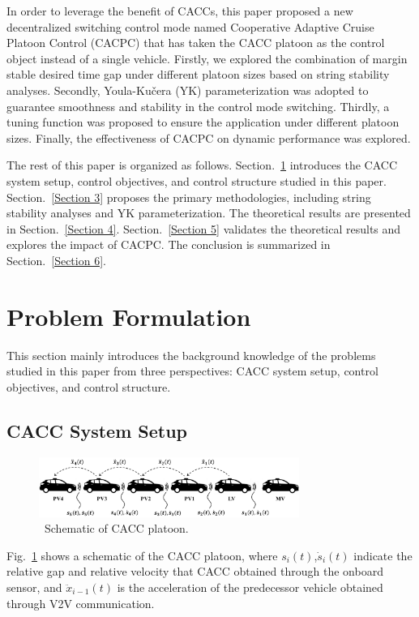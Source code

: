 \documentclass[journal]{IEEEtran}
\begin{document}
In order to leverage the benefit of CACCs, this paper proposed a new decentralized switching control mode named Cooperative Adaptive Cruise Platoon Control (CACPC) that has taken the CACC platoon as the control object instead of a single vehicle. Firstly, we explored the combination of margin stable desired time gap under different platoon sizes based on string stability analyses. Secondly, Youla-Kučera (YK) parameterization was adopted to guarantee smoothness and stability in the control mode switching. Thirdly, a tuning function was proposed to ensure the application under different platoon sizes. Finally, the effectiveness of CACPC on dynamic performance was explored.

The rest of this paper is organized as follows. Section.~\ref{Section 2} introduces the CACC system setup, control objectives, and control structure studied in this paper. Section.~\ref{Section 3} proposes the primary methodologies, including string stability analyses and YK parameterization. The theoretical results are presented in Section.~\ref{Section 4}. Section.~\ref{Section 5} validates the theoretical results and explores the impact of CACPC. The conclusion is summarized in Section.~\ref{Section 6}.


\section{Problem Formulation}
\label{Section 2}
This section mainly introduces the background knowledge of the problems studied in this paper from three perspectives: CACC system setup, control objectives, and control structure.


\subsection{CACC System Setup}
\label{Section 2.1}

\begin{figure}
  \centering
  \includegraphics[width=8.5cm]{figs/fig1.png}
  \caption{~Schematic of CACC platoon.}
  \label{fig1}
\end{figure}

Fig.~\ref{fig1} shows a schematic of the CACC platoon, where $s_i (t)$,$\dot{s}_{i} (t)$ indicate the relative gap and relative velocity that CACC obtained through the onboard sensor, and $\ddot{x}_{i-1} (t)$ is the acceleration of the predecessor vehicle obtained through V2V communication.
\end{document}
